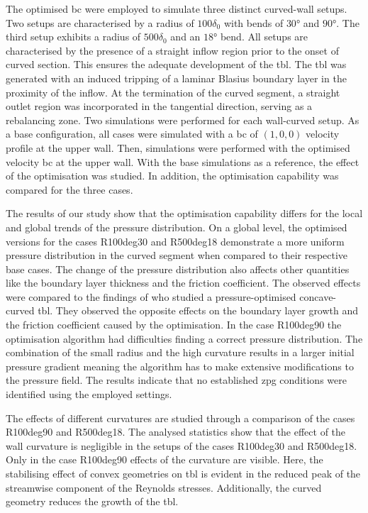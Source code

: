 The optimised \acrshort{bc} were employed to simulate three distinct curved-wall setups.
Two setups are characterised by a radius of $100\delta_0$ with bends of $30$° and $90$°.
The third setup exhibits a radius of $500 \delta_0$ and an $18$° bend.
All setups are characterised by the presence of a straight inflow region prior to the onset of curved section. This ensures the adequate development of the \acrshort{tbl}.
The \acrshort{tbl} was generated with an induced tripping of a laminar Blasius boundary layer in the proximity of the inflow.
At the termination of the curved segment, a straight outlet region was incorporated in the tangential direction, serving as a rebalancing zone.
Two simulations were performed for each wall-curved setup. 
As a base configuration, all cases were simulated with a  \acrlong{bc} of $(1,0,0)$ velocity profile at the upper wall.
Then, simulations were performed with the optimised velocity \acrshort{bc} at the upper wall.
With the base simulations as a reference, the effect of the optimisation was studied.
In addition, the optimisation capability was compared for the three cases.

The results of our study show that the optimisation capability differs for the local and global trends of the pressure distribution.
On a global level, the optimised versions for the cases R100deg30 and R500deg18 demonstrate a more uniform pressure distribution in the curved segment when compared to their respective base cases.
The change of the pressure distribution also affects other quantities like the boundary layer thickness and the friction coefficient.
The observed effects were compared to the findings of \citet{appelbaum_systematic_2025} who studied a pressure-optimised concave-curved \acrshort{tbl}.
They observed the opposite effects on the boundary layer growth and the friction coefficient caused by the optimisation.
In the case R100deg90 the optimisation algorithm had difficulties finding a correct pressure distribution.
The combination of the small radius and the high curvature results in a larger initial pressure gradient meaning the algorithm has to make extensive modifications to the pressure field.
The results indicate that no established \acrshort{zpg} conditions were identified using the employed settings.

The effects of different curvatures are studied through a comparison of the cases R100deg90 and R500deg18.
The analysed statistics show that the effect of the wall curvature is negligible in the setups of the cases R100deg30 and R500deg18.
Only in the case R100deg90 effects of the curvature are visible.
Here, the stabilising effect of convex geometries on \acrlong{tbl} is evident in the reduced peak of the streamwise component of the Reynolds stresses.
Additionally, the curved geometry reduces the growth of the \acrlong{tbl}.

